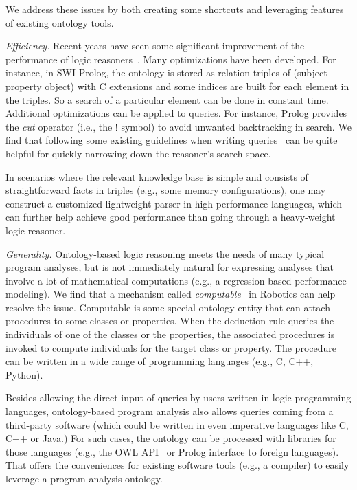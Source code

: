 \vspace*{.1in} We address these issues by
both creating some shortcuts and leveraging features of existing
ontology tools.

{\em Efficiency.}  Recent years have seen some significant improvement
of the performance of logic reasoners~\cite{tsarkov2006fact++, bassiliades2006defeasible}. 
  Many
optimizations have been developed.  For instance, in SWI-Prolog, the
ontology is stored as relation triples of \textsf{(subject property
  object)} with C extensions and some indices are built for each
element in the triples.  So a search of a particular element can be
done in constant time.  Additional optimizations can be applied to
queries.  For instance, Prolog provides the \emph{cut} operator (i.e.,
the ! symbol) to avoid unwanted backtracking in search. We find that
following some existing guidelines when writing
queries~\cite{Bratko2000} can be quite helpful for quickly
narrowing down the reasoner's search space.

In scenarios where the relevant knowledge base is simple and consists
of straightforward facts in triples (e.g., some memory
configurations), one may construct a customized lightweight parser in
high performance languages, which can further help achieve good
performance than going through a heavy-weight logic reasoner.

{\em Generality.} Ontology-based logic reasoning meets the needs of
many typical program analyses, but is not immediately natural for
expressing analyses that involve a lot of mathematical computations
(e.g., a regression-based performance modeling).  We find that a
mechanism called \emph{computable}~\cite{tenorth2009knowrob} in
Robotics can help resolve the issue. Computable is some special
ontology entity that can attach procedures to some classes or
properties.  When the deduction rule queries the individuals of one of
the classes or the properties, the associated procedures is invoked to
compute individuals for the target class or property. The procedure
can be written in a wide range of programming languages (e.g., C, C++,
Python).

Besides allowing the direct input of queries by users written in logic
programming languages, ontology-based program analysis also allows
queries coming from a third-party software (which could be written in
even imperative languages like C, C++ or Java.) For such cases, the
ontology can be processed with libraries for those languages (e.g.,
the OWL API~\cite{horridge2011owl} or Prolog interface to foreign
languages\cite{bagnara2002foreign}). That offers the conveniences for
existing software tools (e.g., a compiler) to easily leverage a
program analysis ontology.


